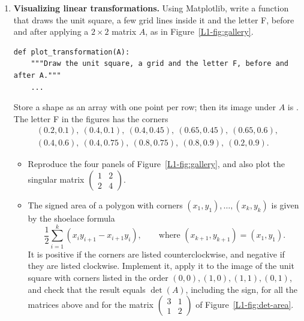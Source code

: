 \begin{enumerate}[label=\textbf{P\arabic*.}, leftmargin=*]
    \item \homework{} \textbf{Visualizing linear transformations.} Using Matplotlib, write a function that draws the unit square, a few grid lines inside it and the letter F, before and after applying a $2 \times 2$ matrix $A$, as in Figure~\ref{L1-fig:gallery}.
\begin{lstlisting}
def plot_transformation(A):
    """Draw the unit square, a grid and the letter F, before and after A."""
    ...
\end{lstlisting}
    Store a shape as an array  with one point per row; then its image under $A$ is . The letter F in the figures has the corners
    \begin{gather*}
        (0.2, 0.1),\ (0.4, 0.1),\ (0.4, 0.45),\ (0.65, 0.45),\ (0.65, 0.6), \\
        (0.4, 0.6),\ (0.4, 0.75),\ (0.8, 0.75),\ (0.8, 0.9),\ (0.2, 0.9).
    \end{gather*}
    \begin{itemize}
        \item Reproduce the four panels of Figure~\ref{L1-fig:gallery}, and also plot the singular matrix $\begin{pmatrix} 1 & 2 \\ 2 & 4 \end{pmatrix}$.
        \item The signed area of a polygon with corners $(x_1, y_1), \ldots, (x_k, y_k)$ is given by the shoelace formula
        \[\frac{1}{2} \sum_{i=1}^k (x_i y_{i+1} - x_{i+1} y_i), \qquad \text{where } (x_{k+1}, y_{k+1}) = (x_1, y_1).\]
        It is positive if the corners are listed counterclockwise, and negative if they are listed clockwise. Implement it, apply it to the image of the unit square with corners listed in the order $(0, 0), (1, 0), (1, 1), (0, 1)$, and check that the result equals $\det(A)$, including the sign, for all the matrices above and for the matrix $\begin{pmatrix} 3 & 1 \\ 1 & 2 \end{pmatrix}$ of Figure~\ref{L1-fig:det-area}.
    \end{itemize}


\end{enumerate}
